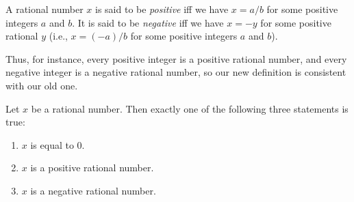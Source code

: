 \begin{defn}\label{i:4.2.6}
  A rational number \(x\) is said to be \emph{positive} iff we have \(x = a / b\) for some positive integers \(a\) and \(b\).
  It is said to be \emph{negative} iff we have \(x = -y\) for some positive rational \(y\)
  (i.e., \(x = (-a) / b\) for some positive integers \(a\) and \(b\)).

  Thus, for instance, every positive integer is a positive rational number, and every negative integer is a negative rational number, so our new definition is consistent with our old one.
\end{defn}

\begin{lem}\label{i:4.2.7}
  Let \(x\) be a rational number.
  Then exactly one of the following three statements is true:
  \begin{enumerate}
    \item \(x\) is equal to \(0\).
    \item \(x\) is a positive rational number.
    \item \(x\) is a negative rational number.
  \end{enumerate}
\end{lem}

